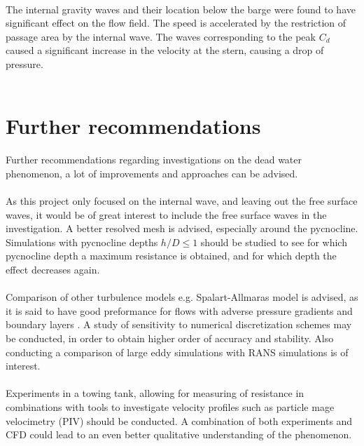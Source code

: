 \documentclass[a4paper, 12pt]{report}
\begin{document}
\\
The internal gravity waves and their location below the barge were found to have significant effect on the flow field. The speed is accelerated by the restriction of passage area by the internal wave. The waves corresponding to the peak $C_d$ caused a significant increase in the velocity at the stern, causing a drop of pressure. \\
\\
\section{Further recommendations}
Further recommendations regarding investigations on the dead water phenomenon, a lot of improvements and approaches can be advised.\\
\\
As this project only focused on the internal wave, and leaving out the free surface waves, it would be of great interest to include the free surface waves in the investigation. A better resolved mesh is advised, especially around the pycnocline. Simulations with pycnocline depths $h/D\leq 1$ should be studied to see for which pycnocline depth a maximum resistance is obtained, and for which depth the effect decreases again.\\
\\
Comparison of other turbulence models e.g. Spalart-Allmaras model is advised, as it is said to have good preformance for flows with adverse pressure gradients and boundary layers \cite{CFD}. A study of sensitivity to numerical discretization schemes may be conducted, in order to obtain higher order of accuracy and stability. Also conducting a comparison of large eddy simulations with RANS simulations is of interest.\\
\\
Experiments in a towing tank, allowing for measuring of resistance in combinations with tools to investigate velocity profiles such as particle mage velocimetry (PIV) should be conducted. A combination of both experiments and CFD could lead to an even better qualitative understanding of the phenomenon. 
\end{document}
